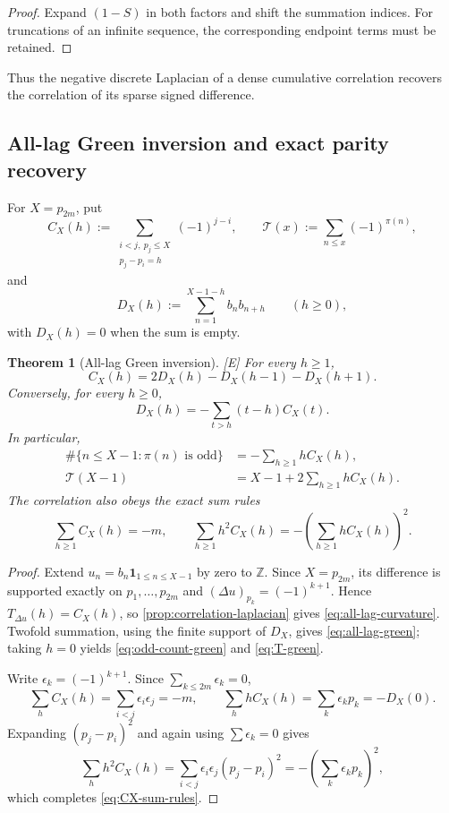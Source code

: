 \documentclass[11pt]{article}
\newtheorem{theorem}{Theorem}[section]
\theoremstyle{definition}
\theoremstyle{remark}
\newcommand{\one}{\mathbf 1}
\newcommand{\status}[1]{\textnormal{\textcolor{accent}{\footnotesize[#1]}}}
\begin{document}
\begin{proof}
Expand $(1-S)$ in both factors and shift the summation indices.  For truncations of an
infinite sequence, the corresponding endpoint terms must be retained.
\end{proof}

Thus the negative discrete Laplacian of a dense cumulative correlation recovers the
correlation of its sparse signed difference.

\subsection{All-lag Green inversion and exact parity recovery}

For $X=p_{2m}$, put
\[
 C_X(h):=
 \sum_{\substack{i<j,\ p_j\le X\\p_j-p_i=h}}(-1)^{j-i},
 \qquad
 \mathcal T(x):=\sum_{n\le x}(-1)^{\pi(n)},
\]
and
\[
 D_X(h):=\sum_{n=1}^{X-1-h}b_nb_{n+h}\qquad(h\ge0),
\]
with $D_X(h)=0$ when the sum is empty.

\begin{theorem}[All-lag Green inversion]\label{thm:all-lag-green}
\status{E}
For every $h\ge1$,
\begin{equation}\label{eq:all-lag-curvature}
 C_X(h)=2D_X(h)-D_X(h-1)-D_X(h+1).
\end{equation}
Conversely, for every $h\ge0$,
\begin{equation}\label{eq:all-lag-green}
 D_X(h)=-\sum_{t>h}(t-h)C_X(t).
\end{equation}
In particular,
\begin{align}
 \#\{n\le X-1:\pi(n)\text{ is odd}\}
  &=-\sum_{h\ge1}hC_X(h),\label{eq:odd-count-green}\\
 \mathcal T(X-1)
  &=X-1+2\sum_{h\ge1}hC_X(h).\label{eq:T-green}
\end{align}
The correlation also obeys the exact sum rules
\begin{equation}\label{eq:CX-sum-rules}
 \sum_{h\ge1}C_X(h)=-m,
 \qquad
 \sum_{h\ge1}h^2C_X(h)
 =-\left(\sum_{h\ge1}hC_X(h)\right)^2.
\end{equation}
\end{theorem}

\begin{proof}
Extend $u_n=b_n\one_{1\le n\le X-1}$ by zero to $\mathbb Z$.  Since
$X=p_{2m}$, its difference is supported exactly on $p_1,\ldots,p_{2m}$ and
$(\Delta u)_{p_k}=(-1)^{k+1}$.  Hence $T_{\Delta u}(h)=C_X(h)$, so
\cref{prop:correlation-laplacian} gives \eqref{eq:all-lag-curvature}.  Twofold
summation, using the finite support of $D_X$, gives \eqref{eq:all-lag-green}; taking
$h=0$ yields \eqref{eq:odd-count-green} and \eqref{eq:T-green}.

Write $\epsilon_k=(-1)^{k+1}$.  Since $\sum_{k\le2m}\epsilon_k=0$,
\[
 \sum_hC_X(h)=\sum_{i<j}\epsilon_i\epsilon_j=-m,
 \qquad
 \sum_hhC_X(h)=\sum_k\epsilon_kp_k=-D_X(0).
\]
Expanding $(p_j-p_i)^2$ and again using $\sum\epsilon_k=0$ gives
\[
 \sum_hh^2C_X(h)
 =\sum_{i<j}\epsilon_i\epsilon_j(p_j-p_i)^2
 =-\left(\sum_k\epsilon_kp_k\right)^2,
\]
which completes \eqref{eq:CX-sum-rules}.
\end{proof}
\end{document}
